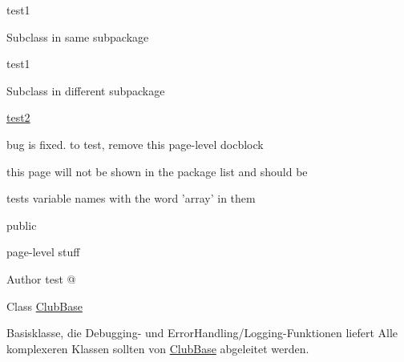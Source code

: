 test1

\-Subclass in same subpackage

test1

\-Subclass in different subpackage

\hyperlink{classtest2}{test2}

bug is fixed. to test, remove this page-\/level docblock

this page will not be shown in the package list and should be

tests variable names with the word 'array' in them

public

page-\/level stuff \begin{DoxyAuthor}{\-Author}
test @
\end{DoxyAuthor}
\-Class \hyperlink{class_club_base}{\-Club\-Base}

\-Basisklasse, die \-Debugging-\/ und \-Error\-Handling/\-Logging-\/\-Funktionen liefert \-Alle komplexeren \-Klassen sollten von \hyperlink{class_club_base}{\-Club\-Base} abgeleitet werden.

